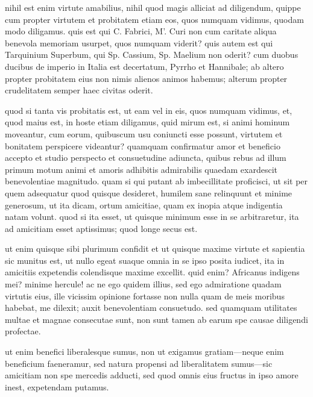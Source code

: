  nihil est enim virtute amabilius, nihil quod magis alliciat ad diligendum, quippe cum propter virtutem et probitatem etiam eos, quos numquam vidimus, quodam modo diligamus. quis est qui C. Fabrici, M'. Curi non cum caritate aliqua benevola memoriam usurpet, quos numquam viderit? quis autem est qui Tarquinium Superbum, qui Sp. Cassium, Sp. Maelium non oderit? cum duobus ducibus de imperio in Italia est decertatum, Pyrrho et Hannibale; ab altero propter probitatem eius non nimis alienos animos habemus; alterum propter crudelitatem semper haec civitas oderit.

 quod si tanta vis probitatis est, ut eam vel in eis, quos numquam vidimus, et, quod maius est, in hoste etiam diligamus, quid mirum est, si animi hominum moveantur, cum eorum, quibuscum usu coniuncti esse possunt, virtutem et bonitatem perspicere videantur? quamquam confirmatur amor et beneficio accepto et studio perspecto et consuetudine adiuncta, quibus rebus ad illum primum motum animi et amoris adhibitis admirabilis quaedam exardescit benevolentiae magnitudo. quam si qui putant ab imbecillitate proficisci, ut sit per quem adsequatur quod quisque desideret, humilem sane relinquunt et minime generosum, ut ita dicam, ortum amicitiae, quam ex inopia atque indigentia natam volunt. quod si ita esset, ut quisque minimum esse in se arbitraretur, ita ad amicitiam esset aptissimus; quod longe secus est.

 ut enim quisque sibi plurimum confidit et ut quisque maxime virtute et sapientia sic munitus est, ut nullo egeat suaque omnia in se ipso posita iudicet, ita in amicitiis expetendis colendisque maxime excellit. quid enim? Africanus indigens mei? minime hercule! ac ne ego quidem illius, sed ego admiratione quadam virtutis eius, ille vicissim opinione fortasse non nulla quam de meis moribus habebat, me dilexit; auxit benevolentiam consuetudo. sed quamquam utilitates multae et magnae consecutae sunt, non sunt tamen ab earum spe causae diligendi profectae.

 ut enim benefici liberalesque sumus, non ut exigamus gratiam—neque enim beneficium faeneramur, sed natura propensi ad liberalitatem sumus—sic amicitiam non spe mercedis adducti, sed quod omnis eius fructus in ipso amore inest, expetendam putamus.

